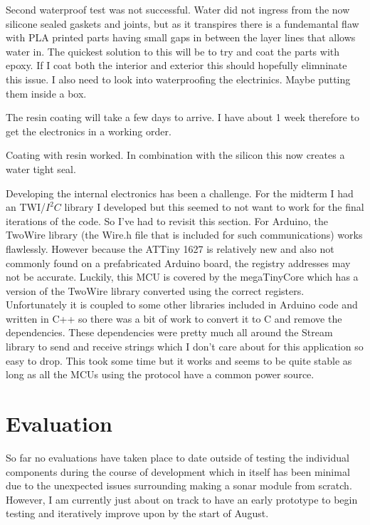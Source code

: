 \documentclass[11pt,a4paper,titlepage]{report}
\begin{document}
	Second waterproof test was not successful. Water did not ingress from the now silicone sealed gaskets and joints, but as it transpires there is a fundemantal flaw with PLA printed parts having small gaps in between the layer lines that allows water in. The quickest solution to this will be to try and coat the parts with epoxy. If I coat both the interior and exterior this should hopefully elimninate this issue. I also need to look into waterproofing the electrinics. Maybe putting them inside a box. 
	
	The resin coating will take a few days to arrive. I have about 1 week therefore to get the electronics in a working order. 
	
	Coating with resin worked. In combination with the silicon this now creates a water tight seal. 
	
	Developing the internal electronics has been a challenge. For the midterm I had an TWI/$I^{2}C$ library I developed but this seemed to not want to work for the final iterations of the code. So I've had to revisit this section. 
	For Arduino, the TwoWire\cite{ARDUINO_WIRE} library (the Wire.h file that is included for such communications) works flawlessly. However because the ATTiny 1627 is relatively new and also not commonly found on a prefabricated Arduino board, the registry addresses may not be accurate. Luckily, this MCU is covered by the megaTinyCore\cite{MEGATINYCORE} which has a version of the TwoWire \cite{MEGATINYCORE_WIRE} library converted using the correct registers. Unfortunately it is coupled to some other libraries included in Arduino code and written in C++ so there was a bit of work to convert it to C and remove the dependencies. These dependencies were pretty much all around the Stream library to send and receive strings which I don't care about for this application so easy to drop. This took some time but it works and seems to be quite stable as long as all the MCUs using the protocol have a common power source.  

	
	\chapter*{Evaluation}
	
	So far no evaluations have taken place to date outside of testing the individual components during the course of development which in itself has been minimal due to the unexpected issues surrounding making a sonar module from scratch. However, I am currently just about on track to have an early prototype to begin testing and iteratively improve upon by the start of August. 
	
\end{document}
